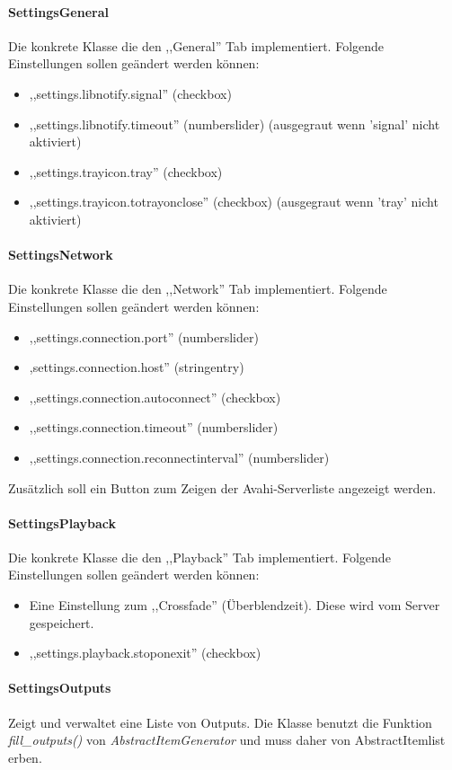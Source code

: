 \paragraph{SettingsGeneral}
Die konkrete Klasse die den ,,General'' Tab implementiert.
Folgende Einstellungen sollen geändert werden können:
\begin{itemize}
\item ,,settings.libnotify.signal'' (checkbox)
\item ,,settings.libnotify.timeout'' (numberslider) (ausgegraut wenn 'signal' nicht aktiviert)
\item ,,settings.trayicon.tray'' (checkbox)
\item ,,settings.trayicon.totrayonclose'' (checkbox) (ausgegraut wenn 'tray' nicht aktiviert)
\end{itemize}

\paragraph{SettingsNetwork}
Die konkrete Klasse die den ,,Network'' Tab implementiert.
Folgende Einstellungen sollen geändert werden können:
\begin{itemize}
\item ,,settings.connection.port'' (numberslider)
\item ,settings.connection.host'' (stringentry)
\item ,,settings.connection.autoconnect'' (checkbox)
\item ,,settings.connection.timeout'' (numberslider)
\item ,,settings.connection.reconnectinterval'' (numberslider)
\end{itemize}
Zusätzlich soll ein Button zum Zeigen der Avahi-Serverliste angezeigt werden.

\paragraph{SettingsPlayback}
Die konkrete Klasse die den ,,Playback'' Tab implementiert.
Folgende Einstellungen sollen geändert werden können:
\begin{itemize}
\item Eine Einstellung zum ,,Crossfade'' (Überblendzeit). Diese wird vom Server gespeichert.
\item ,,settings.playback.stoponexit'' (checkbox)
\end{itemize}

\paragraph{SettingsOutputs}
Zeigt und verwaltet eine Liste von Outputs. Die Klasse benutzt die Funktion \textit{fill\_outputs()} von \emph{AbstractItemGenerator}
und muss daher von AbstractItemlist erben.

